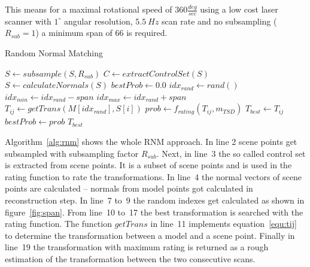 \documentclass[conference]{IEEEtran}
\begin{document}
This means for a maximal rotational speed of $360 \frac{deg}{sec}$ using a low cost laser scanner  with $1^\circ$ angular resolution, $5.5~Hz$ scan rate and no subsampling ($R_{sub} = 1$) a minimum span of 66 is required. 

\begin{algorithm}
	\caption{Random Normal Matching}
	\label{alg:rnm}
	\begin{algorithmic}[1]
		\State $S \gets subsample(S, R_{sub})$
		\State $C \gets extractControlSet(S)$
		\State $S \gets calculateNormals(S)$
		\State $bestProb \gets 0.0$
		\State $idx_{rand} \gets rand()$
		\State $idx_{min} \gets idx_{rand} - span$
		\State $idx_{max} \gets idx_{rand} + span$
		\State $T_{ij} \gets getTrans(M[idx_{rand}], S[i])$
		\State $prob \gets f_{rating}(T_{ij},m_{TSD})$
		\State $T_{best} \gets T_{ij}$
		\State $bestProb \gets prob$
		\EndIf
		\EndFor
		\EndFor
		\State \Return $T_{best}$
		\EndFunction
	\end{algorithmic}
\end{algorithm}



Algorithm~\ref{alg:rnm} shows the whole RNM approach. In line 2 scene points get subsampled with subsampling factor $R_{sub}$.  Next, in line~3 the so called control set is extracted from scene points. It is a subset of scene points and is used in the rating function to rate the transformations.  In line~4 the normal vectors of scene points are calculated -- normals from model points got calculated in reconstruction step. In line~7 to~9 the random indexes get calculated as shown in figure~\ref{fig:span}. From line~10 to~17 the best transformation is searched with the rating function. The function $getTrans$ in line~11 implements equation~\ref{equ:tij} to determine the transformation between a model and a scene point. Finally in line~19 the transformation with maximum rating is returned as a rough estimation of the transformation between the two consecutive scans.
\end{document}
